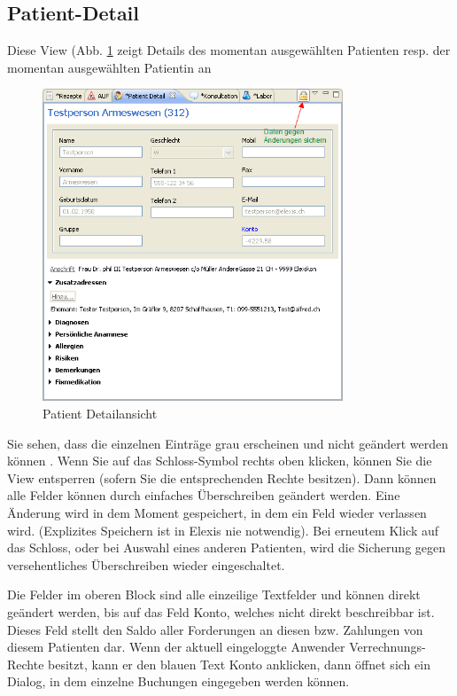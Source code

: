 \subsection{Patient-Detail}
Diese View (Abb. \ref{fig:patdetail} zeigt Details des momentan ausgewählten
Patienten resp. der momentan ausgewählten Patientin an

\begin{figure}[t]
\centering
  \includegraphics[width=0.8\textwidth]{images/patdetail}
  \caption{Patient Detailansicht}
  \label{fig:patdetail}
  \hfill

\end{figure}

Sie sehen, dass die einzelnen Einträge grau erscheinen und nicht geändert werden können . Wenn Sie auf das Schloss-Symbol rechts oben klicken, können Sie die View entsperren (sofern Sie die entsprechenden Rechte besitzen). Dann können
alle Felder können durch einfaches Überschreiben geändert werden. Eine
Änderung wird in dem Moment gespeichert, in dem ein Feld wieder verlassen wird.
(Explizites Speichern ist in Elexis nie notwendig). Bei erneutem Klick auf das Schloss, oder bei Auswahl eines anderen Patienten, wird die Sicherung gegen versehentliches Überschreiben wieder eingeschaltet.

\medskip

Die Felder im oberen Block sind alle einzeilige Textfelder und können direkt geändert
werden, bis auf das Feld \glqq Konto\grqq{}, welches nicht direkt beschreibbar
ist. Dieses Feld stellt den Saldo aller Forderungen an diesen bzw. Zahlungen von
diesem Patienten dar. Wenn der aktuell eingeloggte Anwender Verrechnungs-Rechte
besitzt, kann er den blauen Text \glqq Konto\grqq{} anklicken, dann öffnet sich
ein Dialog, in dem einzelne Buchungen eingegeben werden können.


